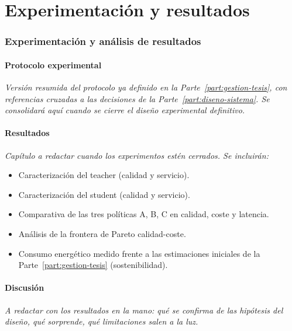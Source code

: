 \part{Experimentación y resultados}
\label{part:experimentacion}

\section{Experimentación y análisis de resultados}
\label{sec:experimentacion-resultados}

\subsection{Protocolo experimental}

\textit{Versión resumida del protocolo ya definido en la Parte~\ref{part:gestion-tesis}, con referencias cruzadas a las decisiones de la Parte~\ref{part:diseno-sistema}. Se consolidará aquí cuando se cierre el diseño experimental definitivo.}

\subsection{Resultados}

\textit{Capítulo a redactar cuando los experimentos estén cerrados. Se incluirán:} 
\begin{itemize}[nosep,leftmargin=*]
\item Caracterización del teacher (calidad y servicio).
\item Caracterización del student (calidad y servicio).
\item Comparativa de las tres políticas A, B, C en calidad, coste y latencia.
\item Análisis de la frontera de Pareto calidad-coste.
\item Consumo energético medido frente a las estimaciones iniciales de la Parte~\ref{part:gestion-tesis} (sostenibilidad).
\end{itemize}

\subsection{Discusión}

\textit{A redactar con los resultados en la mano: qué se confirma de las hipótesis del diseño, qué sorprende, qué limitaciones salen a la luz.}

